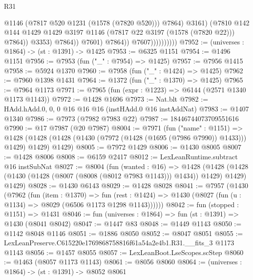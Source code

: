 \begin{lexlean}{R31}
\begin{coremodule}
                                          @1146
                                          (@7817 @520 @1231 (@1578 (@7820 @520)))
                                          @7864)
                                        @3161)
                                      (@7810
                                        @142
                                        @144
                                        @1429
                                        @1429
                                        @3197
                                        @1146
                                        (@7817 @22 @3197 (@1578 (@7820 @22)))
                                        @7864))
                                    @3353)
                                  @7864))
                              @7601)
                            @7864))
                        @7607))))))))))
@7952 := (universes : @1864) -> (st : @1391) -> @1425
@7953 := @6325 @1151
@7954 := @1496 @1151
@7956 := @7953 (fun ("_" : @7954) => @1425)
@7957 := @7956 @1415
@7958 := @5924 @1370
@7960 := @7958 (fun ("_" : @1424) => @1425)
@7962 := @7960 @1398 @1431
@7964 := @1372 (fun ("_" : @1370) => @1425)
@7965 := @7964 @1173
@7971 := @7965 (fun (expr : @1223) => @6144 (@2571 @1340 @1173 @1143))
@7972 := @1428 @1696
@7973 := Nat.blt
@7982 := HAdd.hAdd.{0, 0, 0} @16 @16 @16 (instHAdd.{0} @16 instAddNat)
@7983 := @1407 @1340
@7986 := @7973 (@7982 @7983 @22)
@7987 := 18446744073709551616
@7990 := @17 @7987 (@20 @7987)
@8004 := @7971
    (fun ("name" : @1151) =>
    @1428 (@1428 (@1428 (@1430 (@7972 (@1428 (@1695 (@7986 @7990)) @1433))) @1429) @1429) @1429)
@8005 := @7972 @1429
@8006 := @1430 @8005
@8007 := @1428 @8006
@8008 := @6159 @2417
@8012 := LexLeanRuntime.subtract @16 instSubNat
@8027 := @8004
    (fun (wanted : @16) =>
    @1428
      (@1428 (@1428 (@1430 (@1428 (@8007 (@8008 (@8012 @7983 @1143))) @1434)) @1429) @1429)
      @1429)
@8028 := @1430 @6143
@8029 := @1428 @8028
@8041 := @7957
    (@1430
      (@7962
        (fun (item : @1370) =>
        fun (rest : @1424) => @1430 (@8027 (fun (u : @1134) => @8029 (@6506 @1173 @1298 @1143))))))
@8042 := fun (stopped : @1151) => @1431
@8046 := fun (universes : @1864) => fun (st : @1391) => @1430 (@8041 @8042)
@8047 := @1447 @83
@8048 := @1449 @1143
@8050 := @1142 @8048 @1146
@8051 := @1886 @8050
@8052 := @8047 @8051
@8055 := LexLeanPreserve.C615220e1769868758816f61a54a2e4b1.R31.__fits_3 @1173 @1143
@8056 := @1457 @8055
@8057 := LexLeanBoot.LseScopes.scStep
@8060 := @1463 (@8057 @1173 @1143)
@8061 := @8056 @8060
@8064 := (universes : @1864) -> (st : @1391) -> @8052 @8061

\end{coremodule}
\end{lexlean}
